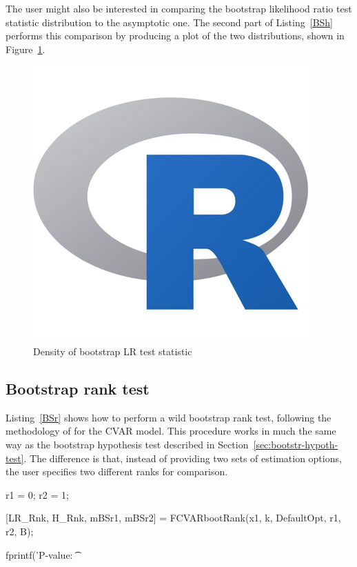 \documentclass[article]{jss}
\begin{document}
The user might also be interested in comparing the bootstrap likelihood ratio test statistic distribution to the asymptotic one. The second part of Listing~\ref{BSh} performs this comparison by producing a plot of the two distributions, shown in Figure~\ref{fig:BS}.

\begin{figure}[tbh]
  \centering
  \caption{Density of bootstrap LR test statistic}
  \label{fig:BS}
  \includegraphics[scale = 1, keepaspectratio=true]{Figures/LRdensity_bw045.png}
\end{figure}


\subsection{Bootstrap rank test}
\label{sec:bootstrap-rank-test}

Listing~\ref{BSr} shows how to perform a wild bootstrap rank test, following the methodology of \cite{Cavaliere2010} for the CVAR model. This procedure works in much the same way as the bootstrap hypothesis test described in Section~\ref{sec:bootstr-hypoth-test}. The difference is that, instead of providing two sets of estimation options, the user specifies two different ranks for comparison.

\begin{Code}

r1 = 0;
r2 = 1;

[LR_Rnk, H_Rnk, mBSr1, mBSr2] = FCVARbootRank(x1, k, DefaultOpt, r1, r2, B);

fprintf('P-value: \t %

\end{Code}
\end{document}
